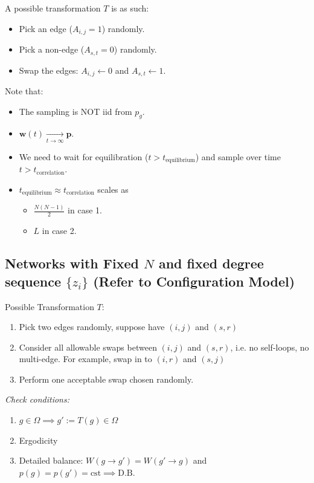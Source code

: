 \documentclass[12pt]{article}
\theoremstyle{definition}
\newcommand{\B}[1]{\boldsymbol{\boldsymbol{#1}}}
\begin{document}
A possible transformation $T$ is as such: 
\begin{itemize}
    \item Pick an edge ($A_{i,j}=1$) randomly. 
    \item Pick a non-edge ($A_{s,t}=0$) randomly. 
    \item Swap the edges: $A_{i,j}\leftarrow 0$ and $A_{s,t}\leftarrow 1$. 
\end{itemize}


Note that: 
\begin{itemize}
    \item The sampling is NOT iid from $p_g$. 
    \item $\B{w}(t)\xrightarrow[t \to\infty]{} \B{p}$. 
    \item We need to wait for equilibration ($t>t_{\text{equilibrium}}$) and sample over time $t>t_{\text{correlation}}$. 
    \item $t_{\text{equilibrium}}\approx t_{\text{correlation}}$ scales as
    \begin{itemize}
        \item $\frac{N(N-1)}{2}$ in case 1. 
        \item $L$ in case 2. 
    \end{itemize}
\end{itemize}

\subsection{Networks with Fixed $N$ and fixed degree sequence $\{z_i\}$ (Refer to Configuration Model)}

Possible Transformation $T$:
\begin{enumerate}
    \item Pick two edges randomly, suppose have $(i,j)$ and $(s,r)$
    \item Consider all allowable swaps between $(i,j)$ and $(s,r)$, i.e. no self-loops, no multi-edge. For example, swap in to $(i,r)$ and $(s,j)$
    \item Perform one acceptable swap chosen randomly. 
\end{enumerate}
\textit{Check conditions:}
\begin{enumerate}
    \item $g\in \Omega\implies g':=T(g) \in \Omega$
    \item Ergodicity
    \item Detailed balance: $W(g\to g') = W(g'\to g)$ and $p(g)=p(g') = \mathrm{cst} \implies\mathrm{D.B.}$
\end{enumerate}
\end{document}
